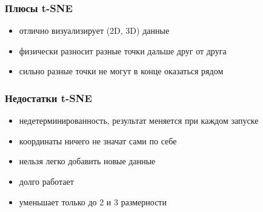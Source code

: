 \subsubsection*{Плюсы t-SNE}
\begin{itemize}
    \item отлично визуализирует (2D, 3D) данные
    \item физически разносит разные точки дальше друг от друга
    \item сильно разные точки не могут в конце оказаться рядом
\end{itemize}

\subsubsection*{Недостатки t-SNE}
\begin{itemize}
    \item недетерминированность, результат меняется при каждом запуске
    \item координаты ничего не значат сами по себе
    \item нельзя легко добавить новые данные
    \item долго работает
    \item уменьшает только до 2 и 3 размерности
\end{itemize}